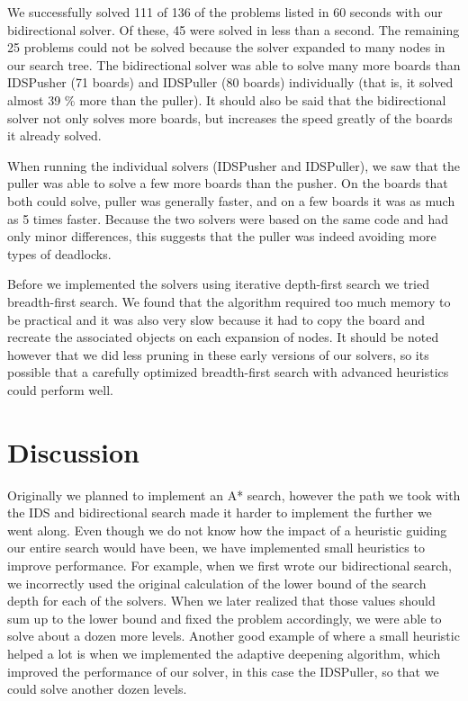 \documentclass[a4paper,11pt]{article}
\renewcommand{\*}[0]{\cdot}
\begin{document}

We successfully solved 111 of 136 of the problems listed in 60 seconds with our
bidirectional solver. Of these, 45 were solved in less than a second. The
remaining 25 problems could not be solved because the solver expanded to many
nodes in our search tree. The bidirectional solver was able to solve many more
boards than IDSPusher (71 boards) and IDSPuller (80 boards) individually (that
is, it solved almost 39 \% more than the puller). It should also be said that
the bidirectional solver not only solves more boards, but increases the speed
greatly of the boards it already solved.

When running the individual solvers (IDSPusher and IDSPuller), we saw that the
puller was able to solve a few more boards than the pusher. On the boards that
both could solve, puller was generally faster, and on a few boards it was as
much as 5 times faster. Because the two solvers were based on the same code and
had only minor differences, this suggests that the puller was indeed avoiding
more types of deadlocks.

Before we implemented the solvers using iterative depth-first search we tried
breadth-first search. We found that the algorithm required too much memory to be
practical and it was also very slow because it had to copy the board and
recreate the associated objects on each expansion of nodes. It should be noted
however that we did less pruning in these early versions of our solvers, so its
possible that a carefully optimized breadth-first search with advanced
heuristics could perform well.


\part*{Discussion}

Originally we planned to implement an A* search, however the path we took with
the IDS and bidirectional search made it harder to implement the further we went
along. Even though we do not know how the impact of a heuristic guiding our
entire search would have been, we have implemented small heuristics to improve
performance. For example, when we first wrote our bidirectional search, we
incorrectly used the original calculation of the lower bound of the search depth
for each of the solvers. When we later realized that those values should sum up
to the lower bound and fixed the problem accordingly, we were able to solve
about a dozen more levels. Another good example of where a small heuristic
helped a lot is when we implemented the adaptive deepening algorithm, which
improved the performance of our solver, in this case the IDSPuller, so that we
could solve another dozen levels.
\end{document}
